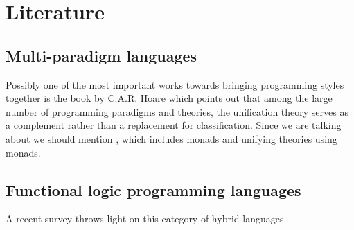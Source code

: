 \documentclass[thesis-solanki.tex]{subfiles}
\begin{document}


\section{Literature}
\subsection{Multi-paradigm languages}
Possibly one of the most important works towards bringing programming styles together is the book
\cite{hoare1998unifying} by C.A.R.
Hoare which points out that among the large number of programming paradigms and theories, the unification theory
serves as a complement rather than a replacement for classification.
Since we are talking about  we should mention \cite{gibbons2013unifying}, which includes monads
and unifying theories using monads.
 

\subsection{Functional logic programming languages}

A recent survey \cite{hanus2007multi} throws light on this category of hybrid languages. 
\end{document}
